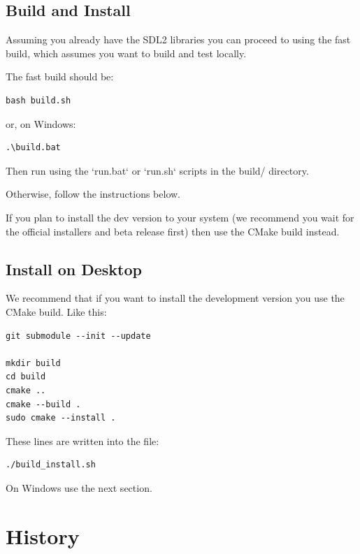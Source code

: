 \documentclass[a4paper]{report}
\begin{document}

\subsection{Build and Install}

Assuming you already have the SDL2 libraries you can proceed to using the fast build, which
assumes you want to build and test locally.

The fast build should be:

\begin{verbatim}
bash build.sh
\end{verbatim}

or, on Windows:

\begin{verbatim}
.\build.bat
\end{verbatim}

Then run using the `run.bat` or `run.sh` scripts in the build/ directory.

Otherwise, follow the instructions below.

If you plan to install the dev version to your system (we recommend you wait
for the official installers and beta release first) then use the CMake build
instead.

\subsection{Install on Desktop}

We recommend that if you want to install the development version you use the CMake build. Like
this:

\begin{lstlisting}
git submodule --init --update

mkdir build
cd build
cmake ..
cmake --build .
sudo cmake --install .
\end{lstlisting}

These lines are written into the file:

\begin{lstlisting}
./build_install.sh
\end{lstlisting}

On Windows use the next section.

\section{History}
\end{document}

